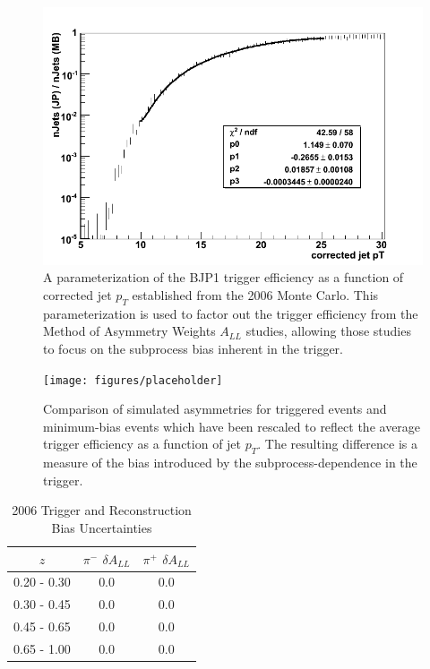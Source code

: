 \begin{figure}
  \includegraphics[width=1.0\textwidth]{figures/trigger-efficiency}
  \caption{A parameterization of the BJP1 trigger efficiency as a function of corrected jet $p_T$ established from the 2006 Monte Carlo.  This parameterization is used to factor out the trigger efficiency from the Method of Asymmetry Weights $A_{LL}$ studies, allowing those studies to focus on the subprocess bias inherent in the trigger.}
  \label{fig:trigger-efficiency}
\end{figure}

\begin{figure}
  \centering
  \texttt{[image: figures/placeholder]}
  \caption{Comparison of simulated asymmetries for triggered events and minimum-bias events which have been rescaled to reflect the average trigger efficiency as a function of jet $p_T$. The resulting difference is a measure of the bias introduced by the subprocess-dependence in the trigger.}
  \label{fig:trig-bias-2006}
\end{figure}

\begin{table}[ht]
    \begin{center}
        \begin{tabular}{c|c|c}
        \hline
        $z$ & $\pi^{-}$ $\delta A_{LL}$ & $\pi^{+}$ $\delta A_{LL}$\\
        \hline
        0.20 - 0.30 & 0.0 &  0.0 \\
        0.30 - 0.45 & 0.0 &  0.0 \\
        0.45 - 0.65 & 0.0 &  0.0 \\
        0.65 - 1.00 & 0.0 &  0.0 \\
    \hline
    \end{tabular}
    \end{center}
    \caption{2006 Trigger and Reconstruction Bias Uncertainties}
    \label{tbl:trig-reco-bias}
\end{table}
